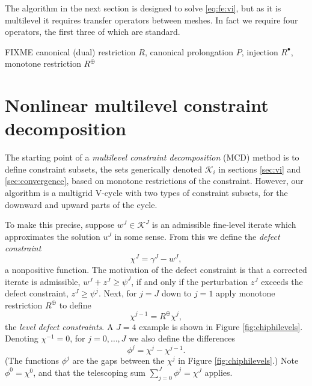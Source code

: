 \documentclass[letterpaper,final,12pt,reqno]{amsart}
\theoremstyle{cstyle}
\theoremstyle{cstyle*}
\theoremstyle{dstyle}
\numberwithin{equation}{section}
\numberwithin{figure}{section}
\numberwithin{table}{section}
\numberwithin{theorem}{section}
\newcommand{\cK}{\mathcal{K}}
\newcommand{\mR}{R^{\bm{\oplus}}}
\newcommand{\iR}{R^{\bullet}}
\begin{document}
The algorithm in the next section is designed to solve \eqref{eq:fe:vi}, but as it is multilevel it requires transfer operators between meshes.  In fact we require four operators, the first three of which are standard.

FIXME canonical (dual) restriction $R$, canonical prolongation $P$, injection $\iR$, monotone restriction $\mR$


\section{Nonlinear multilevel constraint decomposition} \label{sec:multilevel}

The starting point of a \emph{multilevel constraint decomposition} (MCD) \cite{GraeserKornhuber2009,Tai2003} method is to define constraint subsets, the sets generically denoted $\cK_i$ in sections \ref{sec:vi} and \ref{sec:convergence}, based on monotone restrictions of the constraint.  However, our algorithm is a multigrid V-cycle with two types of constraint subsets, for the downward and upward parts of the cycle.

To make this precise, suppose $w^J \in \cK^J$ is an admissible fine-level iterate which approximates the solution $u^J$ in some sense.  From this we define the \emph{defect constraint} \cite{GraeserKornhuber2009}
\begin{equation}
\chi^J = \gamma^J - w^J,  \label{eq:fe:defectconstraintfcn}
\end{equation}
a nonpositive function.  The motivation of the defect constraint is that a corrected iterate is admissible, $w^J + z^J \ge \psi^J$, if and only if the perturbation $z^J$ exceeds the defect constraint, $z^J \ge \psi^j$.  Next, for $j=J$ down to $j=1$ apply monotone restriction $\mR$ to define
\begin{equation}
\chi^{j-1} = \mR \chi^j, \label{eq:fe:chilevels}
\end{equation}
the \emph{level defect constraints}.  A $J=4$ example is shown in Figure \ref{fig:chiphilevels}.  Denoting $\chi^{-1}=0$, for $j=0,\dots,J$ we also define the differences
\begin{equation}
\phi^j = \chi^j - \chi^{j-1}. \label{eq:fe:philevels}
\end{equation}
(The functions $\phi^j$ are the gaps between the $\chi^j$ in Figure \ref{fig:chiphilevels}.)  Note $\phi^0=\chi^0$, and that the telescoping sum $\sum_{j=0}^J \phi^j = \chi^J$ applies.
\end{document}
